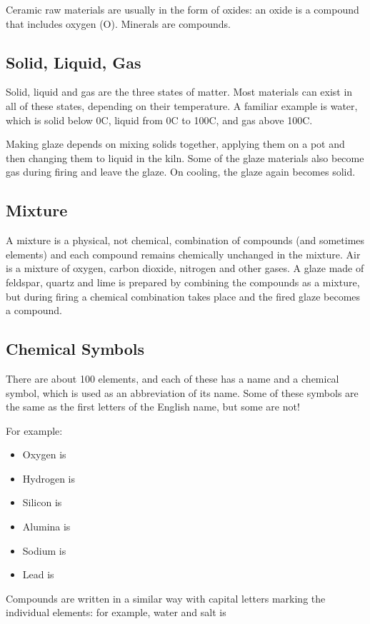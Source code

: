 Ceramic raw materials are usually in the form of oxides: an oxide is a compound 
that includes oxygen (O). Minerals are compounds.
\subsection{Solid, Liquid, Gas}
Solid, liquid and gas are the three states of matter. Most materials can exist 
in all of these states, depending on their temperature. A familiar example is 
water, which is solid below 0\degree C, liquid from 0\degree C to 100\degree C, 
and gas above 100\degree C.

Making glaze depends on mixing solids together, applying them on a pot and then 
changing them to liquid in the kiln. Some of the glaze materials also become 
gas during firing and leave the glaze. On cooling, the glaze again becomes 
solid.
\subsection{Mixture}
A mixture is a physical, not chemical, combination of compounds (and sometimes 
elements) and each compound remains chemically unchanged in the mixture. Air is 
a mixture of oxygen, carbon dioxide, nitrogen and other gases. A glaze made of 
feldspar, quartz and lime is prepared by combining the compounds as a mixture, 
but during firing a chemical combination takes place and the fired glaze 
becomes a compound.
\subsection{Chemical Symbols}
There are about 100 elements, and each of these has a name and a chemical 
symbol, which is used as an abbreviation of its name. Some of these symbols are 
the same as the first letters of the English name, but some are not!

For example:
\begin{itemize}
\item Oxygen is 
\item Hydrogen is 
\item Silicon is 
\item Alumina is 
\item Sodium is 
\item Lead is 
\end{itemize}
Compounds are written in a similar way with capital letters marking the 
individual elements: for example, water  and salt is 

